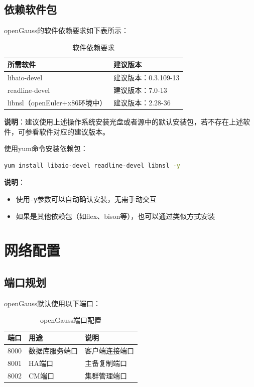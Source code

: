 \documentclass[12pt,UTF8]{ctexbook}
\begin{document}
\subsection{依赖软件包}

openGauss的软件依赖要求如下表所示：

\begin{table}[htbp]
    \centering
    \caption{软件依赖要求}
    \label{tab:dependency_requirements}
    \begin{tabular}{|l|l|}
    \hline
    \textbf{所需软件} & \textbf{建议版本} \\ \hline
    libaio-devel & 建议版本：0.3.109-13 \\ \hline
    readline-devel & 建议版本：7.0-13 \\ \hline
    libnsl（openEuler+x86环境中） & 建议版本：2.28-36 \\ \hline
    \end{tabular}
\end{table}

\textbf{说明}：建议使用上述操作系统安装光盘或者源中的默认安装包，若不存在上述软件，可参看软件对应的建议版本。

使用yum命令安装依赖包：

\begin{lstlisting}[language=bash, caption=安装依赖软件包]
yum install libaio-devel readline-devel libnsl -y
\end{lstlisting}

\textbf{说明}：
\begin{itemize}[leftmargin=2cm]
    \item 使用\texttt{-y}参数可以自动确认安装，无需手动交互
    \item 如果是其他依赖包（如flex、bison等），也可以通过类似方式安装
\end{itemize}

\section{网络配置}

\subsection{端口规划}

openGauss默认使用以下端口：

\begin{table}[htbp]
    \centering
    \caption{openGauss端口配置}
    \label{tab:port_config}
    \begin{tabular}{|l|l|l|}
    \hline
    \textbf{端口} & \textbf{用途} & \textbf{说明} \\ \hline
    8000 & 数据库服务端口 & 客户端连接端口 \\ \hline
    8001 & HA端口 & 主备复制端口 \\ \hline
    8002 & CM端口 & 集群管理端口 \\ \hline
    \end{tabular}
\end{table}
\end{document}
